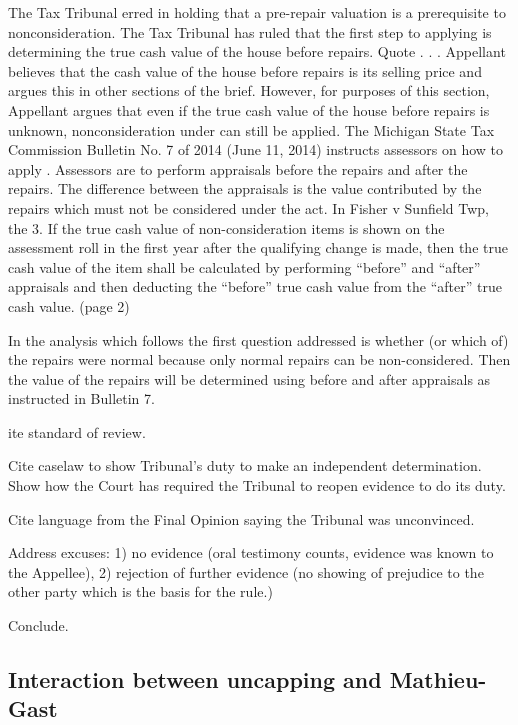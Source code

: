 The Tax Tribunal erred in holding that a pre-repair valuation is a prerequisite to  nonconsideration.
The Tax Tribunal has ruled that the first step to applying  is determining the true cash value of the house before repairs. Quote . . . 
Appellant believes that the cash value of the house before repairs is its selling price and argues this in other sections of the brief. However, for purposes of this section, Appellant argues that even if the true cash value of the house before repairs is unknown, nonconsideration under  can still be applied. 
The Michigan State Tax Commission Bulletin No. 7 of 2014 (June 11, 2014) instructs assessors on how to apply . Assessors are to perform appraisals before the repairs and after the repairs. The difference between the appraisals is the value contributed by the repairs which must not be considered under the act. 
In Fisher v Sunfield Twp, the 
3. If the true cash value of non-consideration items is shown on the assessment roll in the first year after the qualifying change is made, then the true cash value of the item shall be calculated by performing ``before'' and ``after'' appraisals and then deducting the ``before'' true cash value from the ``after'' true cash value. (page 2)
 
In the analysis which follows the first question addressed is whether (or which of) the repairs were normal because only normal repairs can be non-considered. Then the value of the repairs will be determined using before and after appraisals as instructed in Bulletin 7. 
 


ite standard of review.

Cite caselaw to show Tribunal's duty to make an independent determination.
Show how the Court has required the Tribunal to reopen evidence to do its duty.

Cite language from the Final Opinion saying the Tribunal was unconvinced.

Address excuses: 1) no evidence (oral testimony counts, evidence was known to the Appellee), 2) rejection of further evidence (no showing of prejudice to the other party which is the basis for the rule.)

Conclude.

\subsection{Interaction between uncapping and Mathieu-Gast}


